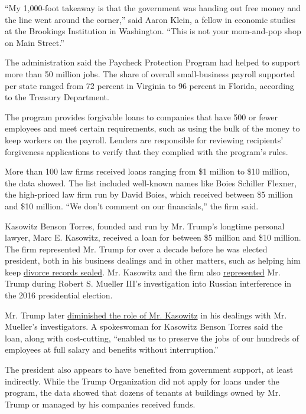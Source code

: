 ``My 1,000-foot takeaway is that the government was handing out free
money and the line went around the corner,'' said Aaron Klein, a fellow
in economic studies at the Brookings Institution in Washington. ``This
is not your mom-and-pop shop on Main Street.''

The administration said the Paycheck Protection Program had helped to
support more than 50 million jobs. The share of overall small-business
payroll supported per state ranged from 72 percent in Virginia to 96
percent in Florida, according to the Treasury Department.

The program provides forgivable loans to companies that have 500 or
fewer employees and meet certain requirements, such as using the bulk of
the money to keep workers on the payroll. Lenders are responsible for
reviewing recipients' forgiveness applications to verify that they
complied with the program's rules.

More than 100 law firms received loans ranging from \$1 million to \$10
million, the data showed. The list included well-known names like Boies
Schiller Flexner, the high-priced law firm run by David Boies, which
received between \$5 million and \$10 million. ``We don't comment on our
financials,'' the firm said.

Kasowitz Benson Torres, founded and run by Mr. Trump's longtime personal
lawyer, Marc E. Kasowitz, received a loan for between \$5 million and
\$10 million. The firm represented Mr. Trump for over a decade before he
was elected president, both in his business dealings and in other
matters, such as helping him keep
\href{https://www.kasowitz.com/evidence/media/kasowitz-successfully-defends-donald-trump-keeping-divorce-records-sealed}{divorce
records sealed}. Mr. Kasowitz and the firm also
\href{https://www.nytimes.com/2018/03/25/us/politics/trump-lawyers-digenova.html}{represented}
Mr. Trump during Robert S. Mueller III's investigation into Russian
interference in the 2016 presidential election.

Mr. Trump later
\href{https://www.nytimes.com/2018/09/18/us/politics/trump-legal-team-lawyers.html}{diminished
the role of Mr. Kasowitz} in his dealings with Mr. Mueller's
investigators. A spokeswoman for Kasowitz Benson Torres said the loan,
along with cost-cutting, ``enabled us to preserve the jobs of our
hundreds of employees at full salary and benefits without
interruption.''

The president also appears to have benefited from government support, at
least indirectly. While the Trump Organization did not apply for loans
under the program, the data showed that dozens of tenants at buildings
owned by Mr. Trump or managed by his companies received funds.


